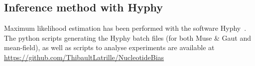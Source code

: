 \subsection{Inference method with Hyphy}

Maximum likelihood estimation has been performed with the software Hyphy~\citep{Pond2005}.
The python scripts generating the Hyphy batch files (for both Muse \& Gaut and mean-field), as well as scripts to analyse experiments are available at \url{https://github.com/ThibaultLatrille/NucleotideBias}
